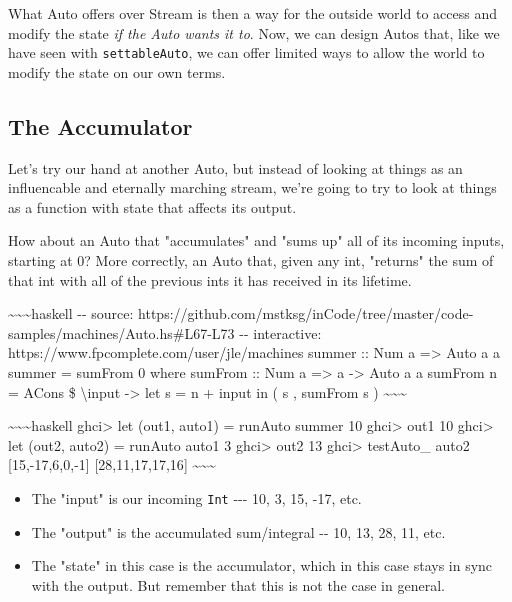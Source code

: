 \documentclass[]{article}
\begin{document}
What Auto offers over Stream is then a way for the outside world to access and
modify the state \emph{if the Auto wants it to}. Now, we can design Autos that,
like we have seen with \texttt{settableAuto}, we can offer limited ways to allow
the world to modify the state on our own terms.

\subsection{The Accumulator}

Let's try our hand at another Auto, but instead of looking at things as an
influencable and eternally marching stream, we're going to try to look at things
as a function with state that affects its output.

How about an Auto that "accumulates" and "sums up" all of its incoming inputs,
starting at 0? More correctly, an Auto that, given any int, "returns" the sum of
that int with all of the previous ints it has received in its lifetime.

\textasciitilde{}\textasciitilde{}\textasciitilde{}haskell -\/- source:
https://github.com/mstksg/inCode/tree/master/code-samples/machines/Auto.hs\#L67-L73
-\/- interactive: https://www.fpcomplete.com/user/jle/machines summer :: Num a
=\textgreater{} Auto a a summer = sumFrom 0 where sumFrom :: Num a
=\textgreater{} a -\textgreater{} Auto a a sumFrom n = ACons \$
\textbackslash{}input -\textgreater{} let s = n + input in ( s , sumFrom s )
\textasciitilde{}\textasciitilde{}\textasciitilde{}

\textasciitilde{}\textasciitilde{}\textasciitilde{}haskell ghci\textgreater{}
let (out1, auto1) = runAuto summer 10 ghci\textgreater{} out1 10
ghci\textgreater{} let (out2, auto2) = runAuto auto1 3 ghci\textgreater{} out2
13 ghci\textgreater{} testAuto\_ auto2 {[}15,-17,6,0,-1{]} {[}28,11,17,17,16{]}
\textasciitilde{}\textasciitilde{}\textasciitilde{}

\begin{itemize}
\tightlist
\item
  The "input" is our incoming \texttt{Int} -\/-\/- 10, 3, 15, -17, etc.
\item
  The "output" is the accumulated sum/integral -\/- 10, 13, 28, 11, etc.
\item
  The "state" in this case is the accumulator, which in this case stays in sync
  with the output. But remember that this is not the case in general.
\end{itemize}
\end{document}
